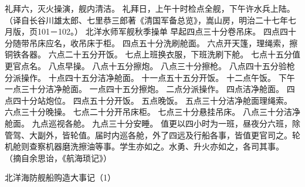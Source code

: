 \documentclass[12pt,UTF8]{ctexbook}
\begin{document}
礼拜六，灭火操演，舰内清洁。
礼拜日，上午十时检点全舰，下午许水兵上陆。
（译自长谷川雄太郎、七里恭三郎著《清国军备总览》，嵩山房，明治二十七年七月版，页101－102。）
北洋水师军舰秋季操单
早起四点三十分卷吊床。
四点四十分随带吊床应名，收吊床于柜。
四点五十分洗刷舱面。
六点开天篷，理绳索，擦铜铁各器。
六点二十五分开饭。
七点上班换衣服，下班洗刷下舱。
七点十五分值更官点名。
八点早操。
八点十五分擦炮。
八点三十分擦枪。
八点四十五分验枪分派操作。
十点四十五分洁净舱面。
十一点五十五分开饭。
十二点午饭。
下午一点三十分洁净舱面。
一点四十五分擦炮。
二点分派操作。
四点洁净舱面。
四点四十分站炮位。
四点五十分开饭。
五点晚饭。
五点三十分洁净舱面理绳索。
六点三十分晚操。
七点二十分开吊床柜。
七点三十分悬挂吊床。
八点三十分洁净舱面。
九点巡视各舱。
九点三十分安睡。
值更以四小时为一班，昼夜分六班，除管驾、大副外，皆轮值。届时内巡各舱，外了四远及行船各事，皆值更官司之。轮机舱则查察机器磨洗擦油等事。学生亦如之。水勇、升火亦如之，各司其事。
（摘自余思诒，《航海琐记》）




北洋海防舰船购造大事记（1）
\end{document}
